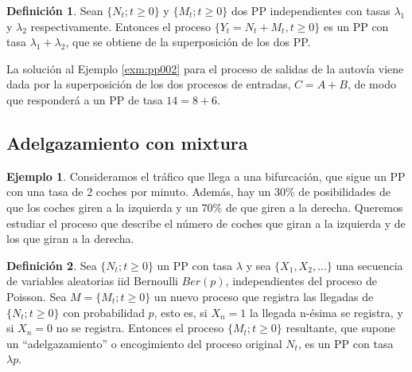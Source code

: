 \documentclass[
]{book}
\newenvironment{yellowbox}{
  \definecolor{shadecolor}{rgb}{210, 180, 140}  
  \color{black}
  \begin{shaded}}
 {\end{shaded}}
\theoremstyle{definition}
\newtheorem{definition}{Definición}[chapter]
\theoremstyle{definition}
\newtheorem{example}{Ejemplo}[chapter]
\theoremstyle{definition}
\theoremstyle{definition}
\theoremstyle{remark}
\begin{document}
\begin{yellowbox}

\begin{definition}
Sean \(\{N_t; t \geq 0\}\) y \(\{M_t; t \geq 0\}\) dos PP independientes con tasas \(\lambda_1\) y \(\lambda_2\) respectivamente. Entonces el proceso \(\{Y_t = N_t + M_t, t \geq 0\}\) es un PP con tasa \(\lambda_1 + \lambda_2\), que se obtiene de la superposición de los dos PP.
\end{definition}

\end{yellowbox}

La solución al Ejemplo \ref{exm:pp002} para el proceso de salidas de la autovía viene dada por la superposición de los dos procesos de entradas, \(C=A+B\), de modo que responderá a un PP de tasa \(14=8+6\).

\hypertarget{adelgazamiento_pp}{%
\subsection{Adelgazamiento con mixtura}\label{adelgazamiento_pp}}

\begin{example}
\protect\hypertarget{exm:pp003}{}\label{exm:pp003}Consideramos el tráfico que llega a una bifurcación, que sigue un PP con una tasa de 2 coches por minuto. Además, hay un 30\% de posibilidades de que los coches giren a la izquierda y un 70\% de que giren a la derecha. Queremos estudiar el proceso que describe el número de coches que giran a la izquierda y de los que giran a la derecha.
\end{example}

\begin{yellowbox}

\begin{definition}
Sea \(\{N_t; t \geq 0\}\) un PP con tasa \(\lambda\) y sea \(\{X_1,X_2,...\}\) una secuencia de variables aleatorias iid Bernoulli \(Ber(p)\), independientes del proceso de Poisson. Sea \(M = \{M_t ;t \geq 0 \}\) un nuevo proceso que registra las llegadas de \(\{N_t; t \geq 0\}\) con probabilidad \(p\), esto es, si \(X_n=1\) la llegada n-ésima se registra, y si \(X_n=0\) no se registra. Entonces el proceso \(\{M_t; t \geq 0\}\) resultante, que supone un ``adelgazamiento'' o encogimiento del proceso original \(N_t\), es un PP con tasa \(\lambda p\).
\end{definition}

\end{yellowbox}
\end{document}
